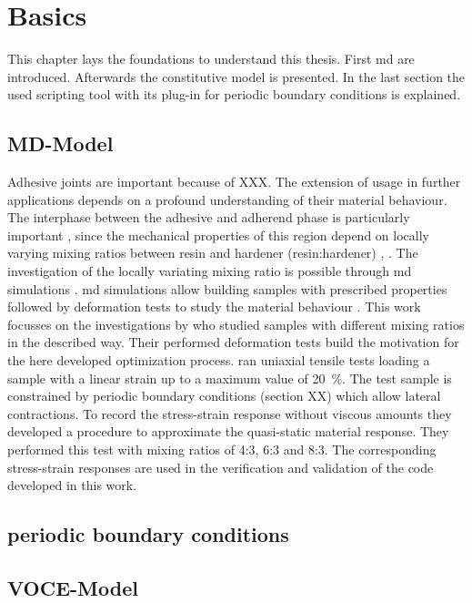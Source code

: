 \chapter{Basics}
This chapter lays the foundations to understand this thesis. First \acrfull{md} are introduced. Afterwards the constitutive model is presented. In the last section the used scripting tool with its plug-in for periodic boundary conditions is explained.  

    \section{MD-Model}
    Adhesive joints are important because of XXX. The extension of usage in further applications depends on a profound understanding of their material behaviour. The interphase between the adhesive and adherend phase is particularly important \cite{roche_measurement_1994}, since the mechanical properties of this region depend on locally varying mixing ratios between resin and hardener (resin:hardener) \cite{ries_deciphering_nodate}, \cite{garifullin_dependence_2019}. The investigation of the locally variating mixing ratio is possible through \acrshort{md} simulations \cite{dotschel_reactive_2026}. \acrshort{md} simulations allow building samples with prescribed properties followed by deformation tests to study the material behaviour \cite{buyukozturk_structural_2011}. 
    This work focusses on the investigations by \citet{ries_deciphering_nodate} who studied samples with different mixing ratios in the described way. Their performed deformation tests build the motivation for the here developed optimization process. \citet{ries_deciphering_nodate} ran uniaxial tensile tests loading a sample with a linear strain up to a maximum value of 20 \%. The test sample is constrained by periodic boundary conditions (section XX) which allow lateral contractions. To record the stress-strain response without viscous amounts they developed a procedure to approximate the quasi-static material response. They performed this test with mixing ratios of 4:3, 6:3 and 8:3. The corresponding stress-strain responses are used in the verification and validation of the code developed in this work. 


    \section{periodic boundary conditions}
    
    \section{VOCE-Model}

